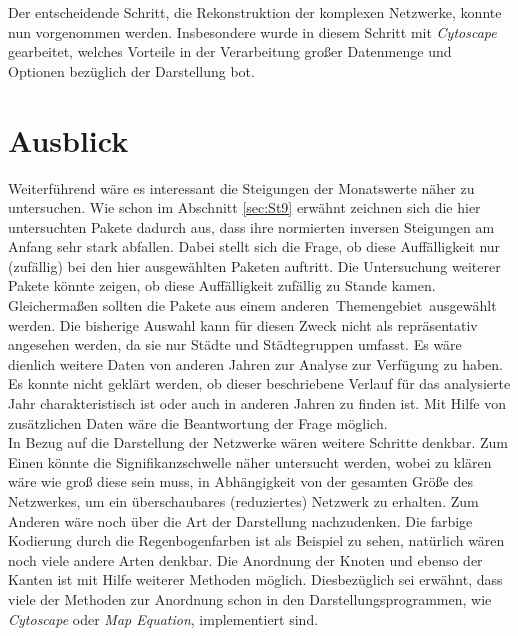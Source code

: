 \documentclass[fontsize=11pt, twoside, a4paper]{scrartcl}
\begin{document}
Der entscheidende Schritt, die Rekonstruktion der komplexen Netzwerke, konnte nun vorgenommen werden. Insbesondere wurde in diesem Schritt mit \textit{Cytoscape} gearbeitet, welches Vorteile in der Verarbeitung großer Datenmenge und Optionen bezüglich der Darstellung bot. 

\section{Ausblick}
Weiterführend wäre es interessant die Steigungen der Monatswerte näher zu untersuchen. Wie schon im Abschnitt \ref{sec:St9} erwähnt zeichnen sich die hier untersuchten Pakete dadurch aus, dass ihre normierten inversen Steigungen am Anfang sehr stark abfallen. Dabei stellt sich die Frage, ob diese Auffälligkeit nur (zufällig) bei den hier ausgewählten Paketen auftritt. Die Untersuchung weiterer Pakete könnte zeigen, ob diese Auffälligkeit zufällig zu Stande kamen. Gleichermaßen sollten die Pakete aus einem anderen \,\glqq Themengebiet\grqq \, ausgewählt werden. Die bisherige Auswahl kann für diesen Zweck nicht als repräsentativ angesehen werden, da sie nur Städte und Städtegruppen umfasst. Es wäre dienlich weitere Daten von anderen Jahren zur Analyse zur Verfügung zu haben. Es konnte nicht geklärt werden, ob dieser beschriebene Verlauf für das analysierte Jahr charakteristisch ist oder auch in anderen Jahren zu finden ist. Mit Hilfe von zusätzlichen Daten wäre die Beantwortung der Frage möglich.\\
In Bezug auf die Darstellung der Netzwerke wären weitere Schritte denkbar. Zum Einen könnte die Signifikanzschwelle näher untersucht werden, wobei zu klären wäre wie groß diese sein muss, in Abhängigkeit von der gesamten Größe des Netzwerkes, um ein überschaubares (reduziertes) Netzwerk zu erhalten. Zum Anderen wäre noch über die Art der Darstellung nachzudenken. Die farbige Kodierung durch die Regenbogenfarben ist als Beispiel zu sehen, natürlich wären noch viele andere Arten denkbar. Die Anordnung der Knoten und ebenso der Kanten ist mit Hilfe weiterer Methoden möglich. Diesbezüglich sei erwähnt, dass viele der Methoden zur Anordnung schon in den Darstellungsprogrammen, wie \textit{Cytoscape} oder \textit{Map Equation}, implementiert sind.\\
\end{document}

